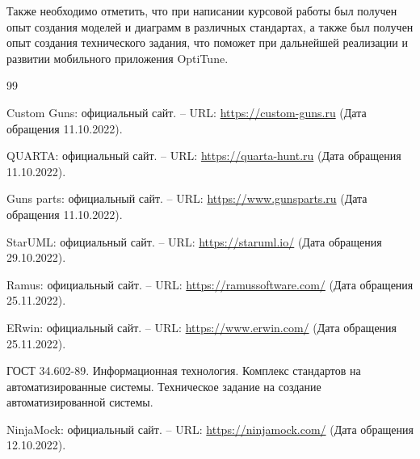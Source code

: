 \documentclass[14pt]{extreport}
\begin{document}
Также необходимо отметить, что при написании курсовой работы был получен опыт создания моделей и диаграмм в различных стандартах, а также был получен опыт создания технического задания, что поможет при дальнейшей реализации и развитии мобильного приложения OptiTune.


\newpage
\begin{thebibliography}{99}

 Custom Guns: официальный сайт. – URL: \url{https://custom-guns.ru} (Дата обращения 11.10.2022).

 QUARTA: официальный сайт. – URL: \url{https://quarta-hunt.ru} (Дата обращения 11.10.2022).

 Guns parts: официальный сайт. – URL: \url{https://www.gunsparts.ru} (Дата обращения 11.10.2022).

 StarUML: официальный сайт. – URL: \url{https://staruml.io/} (Дата обращения 29.10.2022).

 Ramus: официальный сайт. – URL: \url{https://ramussoftware.com/} (Дата обращения 25.11.2022).

 ERwin: официальный сайт. – URL: \url{https://www.erwin.com/} (Дата обращения 25.11.2022).

 ГОСТ 34.602-89. Информационная технология. Комплекс стандартов на автоматизированные системы. Техническое задание на создание автоматизированной системы.

 NinjaMock: официальный сайт. – URL: \url{https://ninjamock.com/} (Дата обращения 12.10.2022).

\end{thebibliography}
\end{document}
